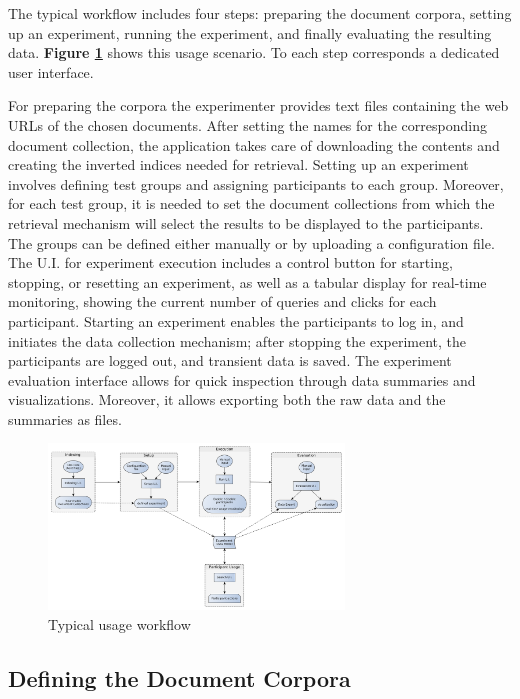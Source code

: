 \documentclass[a4paper]{usiinfbachelorproject}
\begin{document}
The typical workflow includes four steps: preparing the document corpora, setting up an experiment, running the experiment,
and finally evaluating the resulting data. \textbf{Figure \ref{fig:usage}} shows this usage scenario. 
To each step corresponds a dedicated user interface. 

For preparing the corpora the experimenter provides text files containing the web URLs of the chosen documents. After setting the names for the
corresponding document collection, the application takes care of downloading the contents and creating the inverted indices needed for retrieval.
Setting up an experiment involves defining test groups and assigning participants to each group. Moreover, for each test group, it is needed
to set the document collections from which the retrieval mechanism will select the results to be displayed to the participants.
The groups can be defined either manually or by uploading a configuration file.
The U.I. for experiment execution includes a control button for starting, stopping, or resetting an experiment, as well 
as a tabular display for real-time monitoring, showing the current number of queries and clicks for each participant.
Starting an experiment enables the participants to log in, and initiates the data collection mechanism; after
stopping the experiment, the participants are logged out, and transient data is saved.
The experiment evaluation interface  allows for quick inspection through data summaries and visualizations. Moreover, it allows
exporting both the raw data and the summaries as files.

\begin{figure}[h]
\centering
\includegraphics[width=0.7\textwidth]{figures/usage}
\caption{Typical usage workflow}
\label{fig:usage}
\end{figure}


\subsection{Defining the Document Corpora} \label{sec:designDefineDocs}
\end{document}
